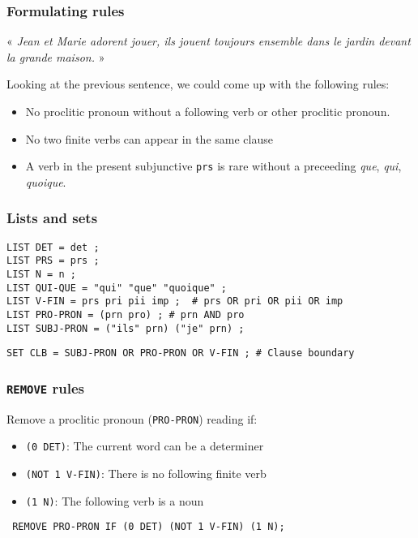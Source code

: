\documentclass[10pt,xetex]{beamer} %
\begin{document}
\begin{frame}
\frametitle{Formulating rules}

\begin{center}
 « \textit{Jean et \alert<4>{Marie} \alert<3>{adorent} jouer, ils
    \alert<3>{jouent} toujours ensemble dans le jardin devant \alert<2>{la
    grande maison}.} »
\end{center}

Looking at the previous sentence, we could come up with the following rules:

\begin{itemize}
  \item No proclitic pronoun without a following verb or other proclitic pronoun.
  \item No two finite verbs can appear in the same clause
  \item A verb in the present subjunctive \texttt{prs} is rare without a preceeding \emph{que}, \emph{qui}, \emph{quoique}.
\end{itemize}

\end{frame}

\begin{frame}[fragile]
\frametitle{Lists and sets}


\begin{verbatim}
LIST DET = det ;
LIST PRS = prs ;
LIST N = n ;
LIST QUI-QUE = "qui" "que" "quoique" ;
LIST V-FIN = prs pri pii imp ;  # prs OR pri OR pii OR imp
LIST PRO-PRON = (prn pro) ; # prn AND pro
LIST SUBJ-PRON = ("ils" prn) ("je" prn) ;
\end{verbatim}

\begin{verbatim}
SET CLB = SUBJ-PRON OR PRO-PRON OR V-FIN ; # Clause boundary
\end{verbatim}

\end{frame}

\begin{frame}
  \frametitle{\texttt{REMOVE} rules}

Remove a proclitic pronoun (\texttt{PRO-PRON}) reading if:

\begin{itemize}
  \item \texttt{(0 DET)}:  The current word can be a determiner
  \item \texttt{(NOT 1 V-FIN)}:  There is no following finite verb
  \item \texttt{(1 N)}: The following verb is a noun
\end{itemize}

\pause
\begin{center}
\texttt{
REMOVE PRO-PRON IF (0 DET) (NOT 1 V-FIN) (1 N);
}
\end{center}
\end{frame}
\end{document}

